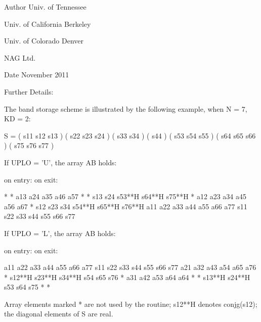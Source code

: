 \begin{DoxyAuthor}{Author}
Univ. of Tennessee 

Univ. of California Berkeley 

Univ. of Colorado Denver 

N\+A\+G Ltd. 
\end{DoxyAuthor}
\begin{DoxyDate}{Date}
November 2011 
\end{DoxyDate}
\begin{DoxyParagraph}{Further Details\+: }
\begin{DoxyVerb}  The band storage scheme is illustrated by the following example, when
  N = 7, KD = 2:

  S = ( s11  s12  s13                     )
      (      s22  s23  s24                )
      (           s33  s34                )
      (                s44                )
      (           s53  s54  s55           )
      (                s64  s65  s66      )
      (                     s75  s76  s77 )

  If UPLO = 'U', the array AB holds:

  on entry:                          on exit:

   *    *   a13  a24  a35  a46  a57   *    *   s13  s24  s53**H s64**H s75**H
   *   a12  a23  a34  a45  a56  a67   *   s12  s23  s34  s54**H s65**H s76**H
  a11  a22  a33  a44  a55  a66  a77  s11  s22  s33  s44  s55    s66    s77

  If UPLO = 'L', the array AB holds:

  on entry:                          on exit:

  a11  a22  a33  a44  a55  a66  a77  s11    s22    s33    s44  s55  s66  s77
  a21  a32  a43  a54  a65  a76   *   s12**H s23**H s34**H s54  s65  s76   *
  a31  a42  a53  a64  a64   *    *   s13**H s24**H s53    s64  s75   *    *

  Array elements marked * are not used by the routine; s12**H denotes
  conjg(s12); the diagonal elements of S are real.\end{DoxyVerb}
 
\end{DoxyParagraph}

